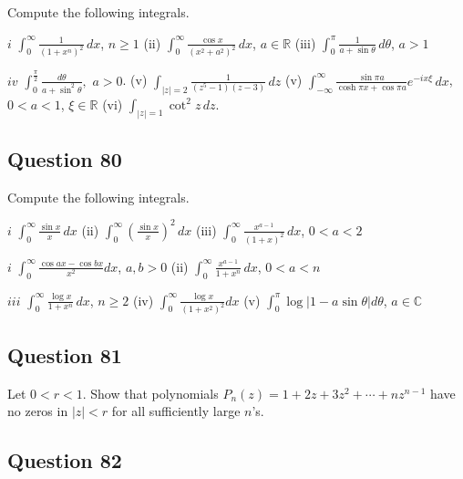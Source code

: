 \documentclass[12pt]{article}
\begin{document}
Compute the following integrals.

\(i\) \(\displaystyle \int_0^\infty \frac{1}{(1 + x^n)^2} \, dx\),
\(n \geq 1\) (ii)
\(\displaystyle \int_0^\infty \frac{\cos x}{(x^2 + a^2)^2} \, dx\),
\(a \in \mathbb R\) (iii)
\(\displaystyle \int_0^\pi \frac{1}{a + \sin \theta} \, d \theta\),
\(a>1\)

\(iv\)
\(\displaystyle \int_0^{\frac{\pi}{2}} \frac{d \theta}{a+ \sin ^2 \theta},\)
\(a >0\). (v)
\(\displaystyle \int_{|z|=2} \frac{1}{(z^{5} -1) (z-3)} \, dz\) (v)
\(\displaystyle \int_{- \infty}^{\infty} \frac{\sin \pi a}{\cosh \pi x + \cos \pi a} e^{- i x \xi} \, d x\),
\(0< a <1\), \(\xi \in \mathbb R\) (vi)
\(\displaystyle \int_{|z| = 1} \cot^2 z \, dz\).

\hypertarget{question-80-2}{%
\subsection{Question 80}\label{question-80-2}}

Compute the following integrals.

\(i\) \(\displaystyle \int_0^\infty \frac{\sin x}{x} \, dx\) (ii)
\(\displaystyle \int_0^\infty (\frac{\sin x}{x})^2 \, dx\) (iii)
\(\displaystyle \int_0^\infty \frac{x^{a-1}}{(1 + x)^2} \, dx\),
\(0< a < 2\)

\(i\) \(\displaystyle \int_0^\infty \frac{\cos a x - \cos bx}{x^2} dx\),
\(a, b >0\) (ii)
\(\displaystyle \int_0^\infty \frac{x^{a-1}}{1 + x^n} \, dx\),
\(0< a < n\)

\(iii\) \(\displaystyle \int_0^\infty \frac{\log x}{1 + x^n} \, dx\),
\(n \geq 2\) (iv)
\(\displaystyle \int_0^\infty \frac{\log x}{(1 + x^2)^2} dx\) (v)
\(\displaystyle \int_0^{\pi} \log|1 - a \sin \theta| d \theta\),
\(a \in \mathbb C\)

\hypertarget{question-81-2}{%
\subsection{Question 81}\label{question-81-2}}

Let \(0<r<1\). Show that polynomials
\(P_n(z) = 1 + 2z + 3 z^2 + \cdots + n z^{n-1}\) have no zeros in
\(|z|<r\) for all sufficiently large \(n\)'s.

\hypertarget{question-82-2}{%
\subsection{Question 82}\label{question-82-2}}
\end{document}
